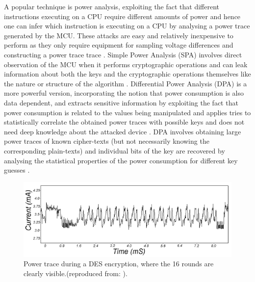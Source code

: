 A popular technique is power analysis, exploiting the fact that different instructions executing on a CPU require different amounts of power \citep{website:riscure} \citep{kocher:DPA} and hence one can infer which instruction is executing on a CPU by analysing a power trace generated by the MCU. These attacks are easy and relatively inexpensive to perform as they only require equipment for sampling voltage differences and constructing a power trace trace \citep{kocher:DPA}. Simple Power Analysis (SPA) involves direct observation of the MCU when it performs cryptographic operations and can leak information about both the keys and the cryptographic operations themselves like the nature or structure of the algorithm \citep{kocher:DPA} \citep{anderson:tamper_resistance}. Differential Power Analysis (DPA) is a more powerful version, incorporating the notion that power consumption is also data dependent, and extracts sensitive information by exploiting the fact that power consumption is related to the values being manipulated and applies tries to statistically correlate the obtained power traces with possible keys and does not need deep knowledge about the attacked device \citep{book:power_analysis}. DPA involves obtaining large power traces of known cipher-texts (but not necessarily knowing the corresponding plain-texts) and individual bits of the key are recovered by analysing the statistical properties of the power consumption for different key guesses \citep{kocher:DPA}  \citep{anderson:tamper_resistance}.

	\begin{figure}
		\center
		\includegraphics[scale=0.6]{img/power_des.png}
		\caption{\footnotesize Power trace during a DES encryption, where the 16 rounds are clearly visible.(reproduced from: \protect\citep{kocher:DPA}).}
		\label{fig:des_power}		
	\end{figure}

